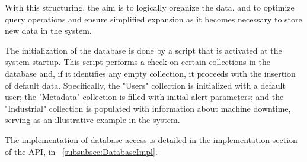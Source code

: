 With this structuring, the aim is to logically organize the data, and to optimize query operations and ensure simplified expansion as it becomes necessary to store new data in the system.

The initialization of the database is done by a script that is activated at the system startup. This script performs a check on certain collections in the database and, if it identifies any empty collection, it proceeds with the insertion of default data. Specifically, the "Users" collection is initialized with a default user; the "Metadata" collection is filled with initial alert parameters; and the "Industrial" collection is populated with information about machine downtime, serving as an illustrative example in the system.

The implementation of database access is detailed in the implementation section of the \gls{API}, in ~\ref{subsubsec:DatabaseImpl}.